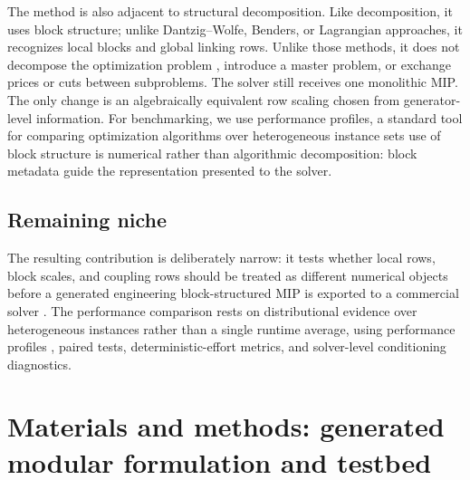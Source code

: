 \documentclass[AMA,Times1COL]{WileyNJDv5} %
\providecommand{\DIFadd}[1]{{\protect\color{blue} \sf #1}} %
\providecommand{\DIFdel}[1]{{\protect\color{red} \scriptsize #1}} %
\providecommand{\DIFaddbegin}{} %
\providecommand{\DIFaddend}{} %
\providecommand{\DIFdelbegin}{} %
\providecommand{\DIFdelend}{} %
\begin{document}
\DIFadd{The method is also adjacent to }\DIFaddend structural decomposition. Like \DIFdelbegin \DIFdel{decomposition, it uses block structure; unlike }\DIFdelend Dantzig--Wolfe, Benders, or
Lagrangian \DIFaddbegin \DIFadd{approaches, it recognizes local blocks and global linking rows. Unlike those
}\DIFaddend methods, it does not decompose the optimization problem\DIFaddbegin \DIFadd{, introduce a master problem, or
exchange prices or cuts between subproblems}\DIFaddend . The solver still receives one monolithic MIP.
The \DIFdelbegin \DIFdel{only change is an algebraically equivalent row scaling
chosen from generator-level information. For benchmarking, we use performance profiles,
a standard tool for comparing optimization algorithms over heterogeneous instance sets
\citep{dolan2002performance}}\DIFdelend \DIFaddbegin \DIFadd{use of block structure is numerical rather than algorithmic decomposition: block
metadata guide the representation presented to the solver}\DIFaddend .

\DIFaddbegin \subsection{\DIFadd{Remaining niche}}

\DIFaddend The resulting contribution is deliberately narrow: it tests whether local rows, block scales, and
coupling rows should be treated as different numerical objects before a generated \DIFdelbegin \DIFdel{engineering }\DIFdelend \DIFaddbegin \DIFadd{block-structured }\DIFaddend MIP
is exported\DIFdelbegin \DIFdel{to a commercial solver}\DIFdelend \DIFaddbegin \DIFadd{. The performance comparison rests on distributional evidence over heterogeneous
instances rather than a single runtime average, using performance profiles
\cite{dolan2002performance}, paired tests, deterministic-effort metrics, and solver-level
conditioning diagnostics}\DIFaddend .

\section{Materials and methods: generated modular formulation and testbed}
\label{sec:model}
\end{document}
